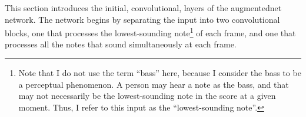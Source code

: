 

This section introduces the initial, convolutional, layers of the \gls{augmentednet} network. The network begins by separating the input into two convolutional blocks, one that processes the lowest-sounding note\footnote{Note that I do not use the term ``bass'' here, because I consider the bass to be a perceptual phenomenon. A person may hear a note as the bass, and that may not necessarily be the lowest-sounding note in the score at a given moment. Thus, I refer to this input as the ``lowest-sounding note''.} of each \gls{frame}, and one that processes all the notes that sound simultaneously at each frame.
